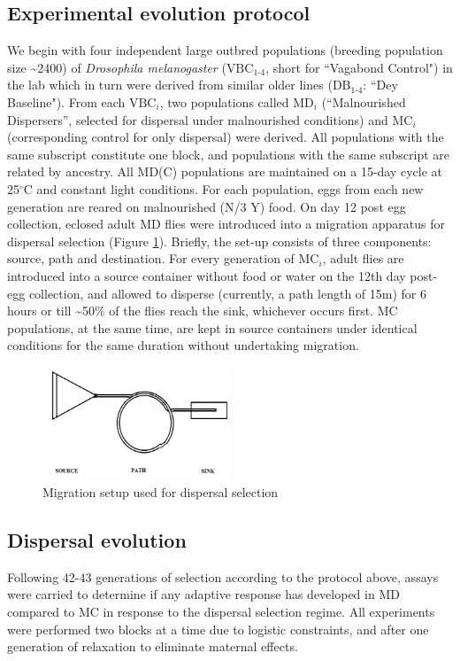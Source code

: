 \documentclass[12pt,onecolumn,twoside]{article}
\begin{document}
	\subsection{Experimental evolution protocol}
	We begin with four independent large outbred populations (breeding population size \textasciitilde 2400) of \textit{Drosophila melanogaster} ($\text{VBC}_{\text{1-4}}$, short for ``Vagabond Control") in the lab which in turn were derived from similar older lines (${\text{DB}}_{\text{1-4}}$: ``Dey Baseline"). From each $\text{VBC}_{i}$, two populations called ${\text{MD}}_{i}$ (“Malnourished Dispersers”, selected for dispersal under malnourished conditions) and ${\text{MC}}_{i}$ (corresponding control for only dispersal) were derived. All populations with the same subscript constitute one block, and populations with the same subscript are related by ancestry. All MD(C) populations are maintained on a 15-day cycle at 25$^{\circ}$C and constant light conditions. For each population, eggs from each new generation are reared on malnourished (N/3 Y) food. On day 12 post egg collection, eclosed adult MD flies were introduced into a migration apparatus for dispersal selection (Figure \ref{fig0}). Briefly, the set-up consists of three components: source, path and destination. For every generation of ${\text{MC}}_{i}$, adult flies are introduced into a source container without food or water on the 12th day post-egg collection, and allowed to disperse (currently, a path length of 15m) for 6 hours or till \textasciitilde 50\% of the flies reach the sink, whichever occurs first. MC populations, at the same time, are kept in source containers under identical conditions for the same duration without undertaking migration.
	\begin{figure}
		\centering
		\includegraphics[width=0.5\textwidth, keepaspectratio]{path.png}
		\caption{\label{fig0} Migration setup used for dispersal selection}
	\end{figure}
	\subsection{Dispersal evolution}
	Following 42-43 generations of selection according to the protocol above, assays were carried to determine if any adaptive response has developed in MD compared to MC in response to the dispersal selection regime. All experiments were performed two blocks at a time due to logistic constraints, and after one generation of relaxation to eliminate maternal effects.
\end{document}
